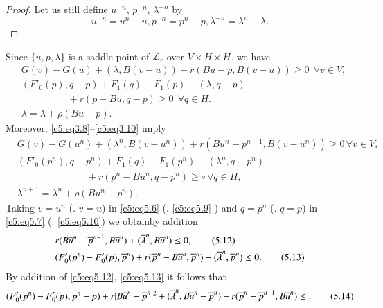 \begin{proof}
Let us still define $u^{-n}$, $p^{-n}$,  $\lambda^{-n}$ by 
$$
u^{-n} = u^n - u, p^{-n}= p^n - p,  \lambda^{-n} = \lambda^n - \lambda. 
$$
\end{proof}
Since $\{u, p, \lambda\}$ is a saddle-point of $\mathscr{L}_r$ over $V \times H \times H$.  we have 
\begin{align*}
& G(v) - G (u) + (\lambda, B(v - u) ) + r (Bu - p, B(v - u) ) \geq 0~~ \forall 
v \in V, \tag{5.6}\label{c5:eq5.6}\\
& (F'_0(p), q - p) + F_1(q) - F_1(p) - (\lambda,  q - p)\\ 
&\hspace{2cm}+ r(p - Bu, q - p) \geq 0~~ 
\forall q \in H.\tag{5.7}\label{c5:eq5.7}\\
& \lambda =  \lambda + \rho (Bu - p). \tag{5.8}\label{c5:eq5.8}
\end{align*}
Moreover, \eqref{c5:eq3.8}--\eqref{c5:eq3.10} imply 
\begin{align*}
&G (v) - G(u^n) + (\lambda^n, B(v - u^n)) + r (Bu^n - p^{n - 1}, B(v -
  u^n)) \geq 0\, \forall v \in V,\tag{5.9}\label{c5:eq5.9}\\ 
& (F'_0 (p^n),  q - p^n)  + F_1 (q) - F_1(p^n) -(\lambda^n, q - p^n)\\
&  \hspace{3cm}+r (p^n -Bu^n,  q - p^n) \geq \circ\, \forall q \in H,
  \tag{5.10}\label{c5:eq5.10}\\ 
&\lambda^{n+1}= \lambda^n + \rho (Bu^n - p^n). \tag{5.11}\label{c5:eq5.11}
\end{align*}
Taking $v=u^n$ (\resp.  $v=u$) in \eqref{c5:eq5.6} (\resp.
\eqref{c5:eq5.9} ) and $q = p^n$ (\resp.  $q=p$) in \eqref{c5:eq5.7}
(\resp. \eqref{c5:eq5.10}) we obtain\pageoriginale  by addition
\begin{align*}
& r(B\overline{u}^{n } - \overline{p}^{n-1},  B\overline{u}^{n}) +  (\overline{\lambda}^{n}, B
  \overline{u}^{n}) \leq 0, \tag{5.12}\label{c5:eq5.12}\\ 
& (F'_0 (p^n) - F'_0 (p), \overline{p}^{n}) + r (\overline{p}^{n} - B\overline{u}^{n},
  \overline{p}^{n}) - (\overline{\lambda}^{n}, \overline{p}^{n}) \leq
  0. \tag{5.13}\label{c5:eq5.13} 
\end{align*}
By addition of \eqref{c5:eq5.12},  \eqref{c5:eq5.13} it follows that 
\begin{equation}
(F'_0 (p^n) - F'_0 (p), p^n - p) + r | B \overline{u}^{n} - \overline{p}^{n}|^2 +
  (\overline{\lambda}^{n},  B\overline{u}^{n} - \overline{p}^{n})+ r (\overline{p}^{n} -
  \overline{p}^{n - 1}, B\overline{u}^{n}) 
  \leq. \tag{5.14}\label{c5:eq5.14} 
\end{equation}

